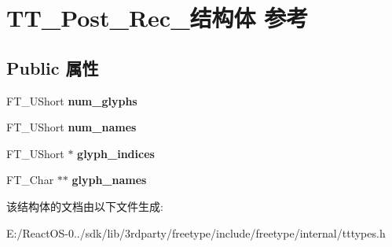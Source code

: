 \hypertarget{struct_t_t___post__20_rec__}{}\section{T\+T\+\_\+\+Post\+\_\+Rec\+\_\+结构体 参考}
\label{struct_t_t___post__20_rec__}
\subsection*{Public 属性}
\begin{DoxyCompactItemize}
\item 
\mbox{\label{struct_t_t___post__20_rec___ae3de3677810e6581f2c197e8fa902979}} 
F\+T\+\_\+\+U\+Short {\bfseries num\+\_\+glyphs}
\item 
\mbox{\label{struct_t_t___post__20_rec___af726ff4997521c76de36f76e1203e2b1}} 
F\+T\+\_\+\+U\+Short {\bfseries num\+\_\+names}
\item 
\mbox{\label{struct_t_t___post__20_rec___a7f0a07ab96ccbe2597378f7aa2de3f8c}} 
F\+T\+\_\+\+U\+Short $\ast$ {\bfseries glyph\+\_\+indices}
\item 
\mbox{\label{struct_t_t___post__20_rec___a8330fbc7db3659ac621e98d7ceb8aad3}} 
F\+T\+\_\+\+Char $\ast$$\ast$ {\bfseries glyph\+\_\+names}
\end{DoxyCompactItemize}


该结构体的文档由以下文件生成\+:\begin{DoxyCompactItemize}
\item 
E\+:/\+React\+O\+S-\/0../sdk/lib/3rdparty/freetype/include/freetype/internal/tttypes.\+h\end{DoxyCompactItemize}
